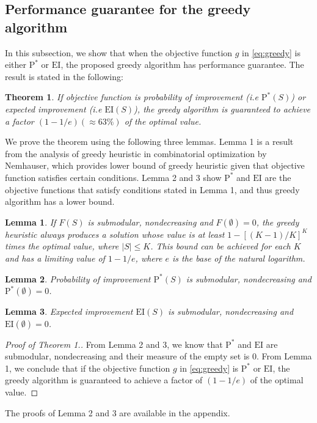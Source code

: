 \documentclass[12pt]{article}
\newcommand{\EI}{\mathrm{EI}}
\newcommand{\PI}{\text{P}^*}
\newtheorem{theorem}{Theorem}
\newtheorem{lemma}{Lemma}
\begin{document}
\subsection{Performance guarantee for the greedy algorithm}
In this subsection, we show that when the objective function $g$ in \eqref{eq:greedy} is either $\PI$ or $\EI$, the proposed greedy algorithm has performance guarantee. The result is stated in the following:
\begin{theorem} 
If objective function is probability of improvement (i.e $\PI(S)$) or expected improvement (i.e $\EI(S)$), the greedy algorithm is guaranteed to achieve a factor $(1-1/e) (\approx 63\%)$ of the optimal value.
\end{theorem}
We prove the theorem using the following three lemmas. Lemma 1 is a result from the analysis of greedy heuristic in combinatorial optimization by Nemhauser, which provides lower bound of greedy heuristic given that objective function satisfies certain conditions. Lemma 2 and 3 show $\PI$ and $\EI$ are the objective functions that satisfy conditions stated in Lemma 1, and thus greedy algorithm has a lower bound.
\begin{lemma} \citep{Company1978}
If $F(S)$ is submodular, nondecreasing and $F(\emptyset)=0$, the greedy heuristic always produces a solution whose value is at least $1-[(K-1)/K]^K$ times the optimal value, where $|S| \leq K$. This bound can be achieved for each $K$ and has a limiting value of $1-1/e$, where $e$ is the base of the natural logarithm.
\end{lemma}

\begin{lemma} 
  Probability of improvement $\PI(S)$ is submodular, nondecreasing and $\PI(\emptyset)=0$.
\end{lemma}
\begin{lemma}
  Expected improvement $\EI(S)$ is submodular, nondecreasing and $\EI(\emptyset)=0$.
\end{lemma}

\begin{proof}[Proof of Theorem 1.]
From Lemma 2 and 3, we know that $\PI$ and $\EI$ are submodular, nondecreasing and their measure of the empty set is 0. From Lemma 1, we conclude that if the objective function $g$ in \eqref{eq:greedy} is $\PI$ or $\EI$, the greedy algorithm is guaranteed to achieve a factor of $(1-1/e)$ of the optimal value. \qedhere
\end{proof}

The proofs of Lemma 2 and 3 are available in the appendix.
\end{document}
